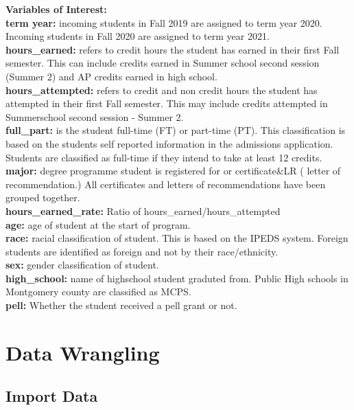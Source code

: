 \documentclass[]{article}
\begin{document}
\textbf{Variables of Interest:}\\
\textbf{term year:} incoming students in Fall 2019 are assigned to term
year 2020. Incoming students in Fall 2020 are assigned to term year
2021.\\
\textbf{hours\_earned:} refers to credit hours the student has earned in
their first Fall semester. This can include credits earned in Summer
school second session (Summer 2) and AP credits earned in high school.\\
\textbf{hours\_attempted:} refers to credit and non credit hours the
student has attempted in their first Fall semester. This may include
credits attempted in Summerschool second session - Summer 2.\\
\textbf{full\_part:} is the student full-time (FT) or part-time (PT).
This classification is based on the students self reported information
in the admissions application. Students are classified as full-time if
they intend to take at least 12 credits.\\
\textbf{major:} degree programme student is registered for or
certificate\&LR ( letter of recommendation.) All certificates and
letters of recommendations have been grouped together.\\
\textbf{hours\_earned\_rate:} Ratio of hours\_earned/hours\_attempted\\
\textbf{age:} age of student at the start of program.\\
\textbf{race:} racial classification of student. This is based on the
IPEDS system. Foreign students are identified as foreign and not by
their race/ethnicity.\\
\textbf{sex:} gender classification of student.\\
\textbf{high\_school:} name of highschool student graduted from. Public
High schools in Montgomery county are classified as MCPS.\\
\textbf{pell:} Whether the student received a pell grant or not.

\hypertarget{data-wrangling}{%
\section{Data Wrangling}\label{data-wrangling}}

\hypertarget{import-data}{%
\subsection{Import Data}\label{import-data}}
\end{document}

